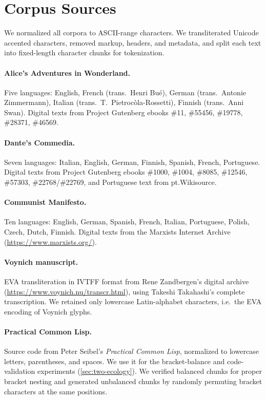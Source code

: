 \documentclass[twoside,11pt]{article}
\begin{document}
\section{Corpus Sources}\label{app:corpora}

We normalized all corpora to ASCII-range characters. We transliterated Unicode accented characters, removed markup, headers, and metadata, and split each text into fixed-length character chunks for tokenization.

\paragraph{Alice's Adventures in Wonderland.}
Five languages: English, French (trans.\ Henri Bu{\'e}), German (trans.\ Antonie Zimmermann), Italian (trans.\ T.\ Pietroc{\`o}la-Rossetti), Finnish (trans.\ Anni Swan). Digital texts from Project Gutenberg ebooks \#11, \#55456, \#19778, \#28371, \#46569.

\paragraph{Dante's Commedia.}
Seven languages: Italian, English, German, Finnish, Spanish, French, Portuguese. Digital texts from Project Gutenberg ebooks \#1000, \#1004, \#8085, \#12546, \#57303, \#22768/\#22769, and Portuguese text from pt.Wikisource.

\paragraph{Communist Manifesto.}
Ten languages: English, German, Spanish, French, Italian, Portuguese, Polish, Czech, Dutch, Finnish. Digital texts from the Marxists Internet Archive (\url{https://www.marxists.org/}).

\paragraph{Voynich manuscript.}
EVA transliteration in IVTFF format from Rene Zandbergen's digital archive (\url{https://www.voynich.nu/transcr.html}), using Takeshi Takahashi's complete transcription. We retained only lowercase Latin-alphabet characters, i.e.\ the EVA encoding of Voynich glyphs.

\paragraph{Practical Common Lisp.}
Source code from Peter Seibel's \emph{Practical Common Lisp}, normalized to lowercase letters, parentheses, and spaces. We use it for the bracket-balance and code-validation experiments (\cref{sec:two-ecology}). We verified balanced chunks for proper bracket nesting and generated unbalanced chunks by randomly permuting bracket characters at the same positions.
\end{document}
